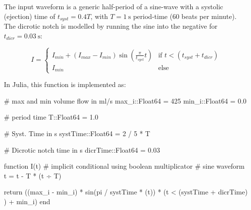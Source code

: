 \documentclass[
  a4paper,
  DIV=11,
  numbers=noendperiod,
  oneside]{scrreprt}
\newenvironment{Shaded}{\begin{snugshade}}{\end{snugshade}}
\newcommand{\CommentTok}[1]{\textcolor[rgb]{0.37,0.37,0.37}{#1}}
\newcommand{\ConstantTok}[1]{\textcolor[rgb]{0.56,0.35,0.01}{#1}}
\newcommand{\ControlFlowTok}[1]{\textcolor[rgb]{0.00,0.23,0.31}{#1}}
\newcommand{\DataTypeTok}[1]{\textcolor[rgb]{0.68,0.00,0.00}{#1}}
\newcommand{\FloatTok}[1]{\textcolor[rgb]{0.68,0.00,0.00}{#1}}
\newcommand{\FunctionTok}[1]{\textcolor[rgb]{0.28,0.35,0.67}{#1}}
\newcommand{\KeywordTok}[1]{\textcolor[rgb]{0.00,0.23,0.31}{#1}}
\newcommand{\NormalTok}[1]{\textcolor[rgb]{0.00,0.23,0.31}{#1}}
\newcommand{\OperatorTok}[1]{\textcolor[rgb]{0.37,0.37,0.37}{#1}}
\begin{document}
The input waveform is a generic half-period of a sine-wave with a
systolic (ejection) time of \(t_{syst} = 0.4 T\), with
\(T=1\ \mathrm{s}\) period-time (60 beats per minute). The dicrotic
notch is modelled by running the sine into the negative for
\(t_{dicr} = 0.03\ \mathrm{s}\):

\begin{equation}
    I = 
    \begin{cases}
        I_{min} + (I_{max} - I_{min})  \sin \left(\frac{\pi}{t_{syst}} t \right) & \text{if } t < (t_{syst} + t_{dicr})\\
        I_{min} & \text{else} 
    \end{cases}
\end{equation}

In Julia, this function is implemented as:

\begin{Shaded}
\begin{Highlighting}[]
\CommentTok{\# max and min volume flow in ml/s}
\NormalTok{max\_i}\OperatorTok{::}\DataTypeTok{Float64 }\OperatorTok{=} \FloatTok{425}
\NormalTok{min\_i}\OperatorTok{::}\DataTypeTok{Float64 }\OperatorTok{=} \FloatTok{0.0}

\CommentTok{\# period time}
\NormalTok{T}\OperatorTok{::}\DataTypeTok{Float64 }\OperatorTok{=} \FloatTok{1.0}

\CommentTok{\# Syst. Time in s}
\NormalTok{systTime}\OperatorTok{::}\DataTypeTok{Float64 }\OperatorTok{=} \FloatTok{2} \OperatorTok{/} \FloatTok{5} \OperatorTok{*}\NormalTok{ T}

\CommentTok{\# Dicrotic notch time in s}
\NormalTok{dicrTime}\OperatorTok{::}\DataTypeTok{Float64 }\OperatorTok{=} \FloatTok{0.03}

\KeywordTok{function} \FunctionTok{I}\NormalTok{(t)}
    \CommentTok{\# implicit conditional using boolean multiplicator}
    \CommentTok{\# sine waveform}
\NormalTok{    t }\OperatorTok{=}\NormalTok{ t }\OperatorTok{{-}}\NormalTok{ T }\OperatorTok{*}\NormalTok{ (t }\OperatorTok{÷}\NormalTok{ T)}

    \ControlFlowTok{return}\NormalTok{ ((max\_i }\OperatorTok{{-}}\NormalTok{ min\_i) }\OperatorTok{*} \FunctionTok{sin}\NormalTok{(}\ConstantTok{pi} \OperatorTok{/}\NormalTok{ systTime }\OperatorTok{*}\NormalTok{ (t))}
            \OperatorTok{*}\NormalTok{ (t }\OperatorTok{\textless{}}\NormalTok{ (systTime }\OperatorTok{+}\NormalTok{ dicrTime) )}
            \OperatorTok{+}\NormalTok{ min\_i)}
\KeywordTok{end} 
\end{Highlighting}
\end{Shaded}
\end{document}

